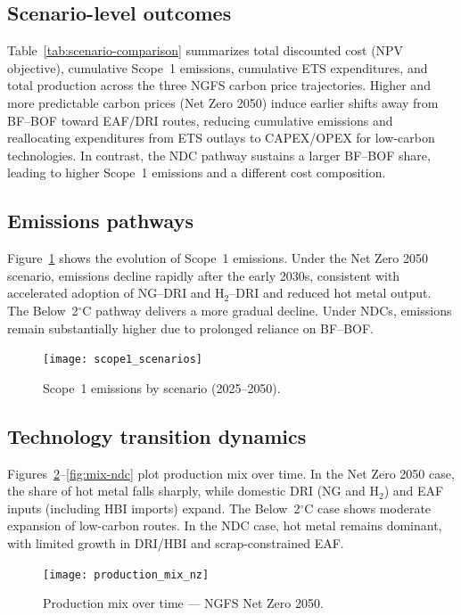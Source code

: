 \documentclass[preprint,5p,authoryear]{elsarticle}
\begin{document}
\subsection{Scenario-level outcomes}
Table~\ref{tab:scenario-comparison} summarizes total discounted cost (NPV objective), cumulative Scope~1 emissions, cumulative ETS expenditures, and total production across the three NGFS carbon price trajectories. Higher and more predictable carbon prices (Net Zero 2050) induce earlier shifts away from BF--BOF toward EAF/DRI routes, reducing cumulative emissions and reallocating expenditures from ETS outlays to CAPEX/OPEX for low-carbon technologies. In contrast, the NDC pathway sustains a larger BF--BOF share, leading to higher Scope~1 emissions and a different cost composition.




\subsection{Emissions pathways}
Figure~\ref{fig:scope1-scenarios} shows the evolution of Scope~1 emissions. Under the Net Zero 2050 scenario, emissions decline rapidly after the early 2030s, consistent with accelerated adoption of NG--DRI and H$_2$--DRI and reduced hot metal output. The Below~2$^\circ$C pathway delivers a more gradual decline. Under NDCs, emissions remain substantially higher due to prolonged reliance on BF--BOF.

\begin{figure}[!t]
  \centering
  \texttt{[image: scope1\_scenarios]}
  \caption{Scope~1 emissions by scenario (2025--2050).}
  \label{fig:scope1-scenarios}
\end{figure}

\subsection{Technology transition dynamics}
Figures~\ref{fig:mix-nz}--\ref{fig:mix-ndc} plot production mix over time. In the Net Zero 2050 case, the share of hot metal falls sharply, while domestic DRI (NG and H$_2$) and EAF inputs (including HBI imports) expand. The Below~2$^\circ$C case shows moderate expansion of low-carbon routes. In the NDC case, hot metal remains dominant, with limited growth in DRI/HBI and scrap-constrained EAF.

\begin{figure}[!t]
  \centering
  \texttt{[image: production\_mix\_nz]}
  \caption{Production mix over time --- NGFS Net Zero 2050.}
  \label{fig:mix-nz}
\end{figure}
\end{document}
